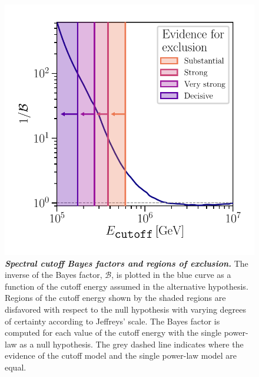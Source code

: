 \begin{figure}
	\centering
	\includegraphics[width=\linewidth]{figures/hese_paper/cutoff_bayes}
	\internallinenumbers
	\caption{\textbf{\textit{Spectral cutoff Bayes factors and regions of exclusion.}}
		The inverse of the Bayes factor, $\mathcal{B}$, is plotted in the blue curve as a function of the cutoff energy assumed in the alternative hypothesis.
		Regions of the cutoff energy shown by the shaded regions are disfavored with respect to the null hypothesis with varying degrees of certainty according to Jeffreys' scale.
		The Bayes factor is computed for each value of the cutoff energy with the single power-law as a null hypothesis.
		The grey dashed line indicates where the evidence of the cutoff model and the single power-law model are equal.}\label{fig:cutoff_bayes}
\end{figure}


